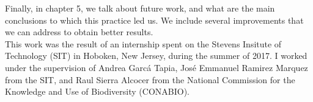Finally, in chapter 5, we talk about future work, and what are the main conclusions to which this practice led us. We include several improvements that we can address to obtain better results.\\

This work was the result of an internship spent on the Stevens Insitute of Technology (SIT) in Hoboken, New Jersey, during the summer of 2017. I worked under the supervision of Andrea Garc\'a Tapia, Jos\'e Emmanuel Ramirez Marquez from the SIT, and Raul Sierra Alcocer from the National Commission for the Knowledge and Use of Biodiversity (CONABIO).\\